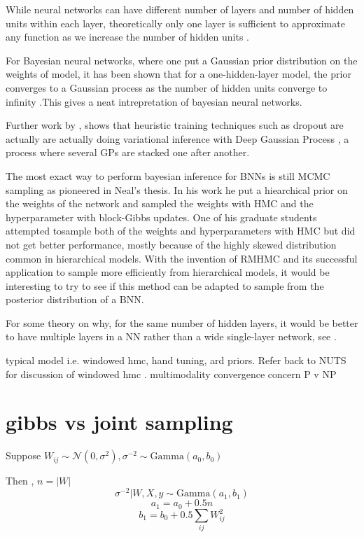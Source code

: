 \documentclass[]{report}
\begin{document}
While neural networks can have different number of layers and number of hidden
units within each layer, theoretically only one layer is sufficient to
approximate any function as we increase the number of hidden units \cite{hornik1991approximation}. 

For Bayesian neural networks, where one put a Gaussian prior distribution on the weights of model, it has been shown that for a one-hidden-layer model, the prior converges to a Gaussian process as the number of hidden units converge to infinity \cite{neal2012bayesian}.This gives a neat intrepretation of bayesian neural networks. 

Further work by \cite{gal2015dropout}, shows that heuristic training techniques such as dropout are actually are actually doing variational inference with Deep Gaussian Process \cite{damianou2013deep}, a process where several GPs are stacked one after another. 

The most exact way to perform bayesian inference for BNNs is still MCMC sampling as pioneered in Neal's thesis. In his work he put a hiearchical prior on the weights of the network and sampled the weights with HMC and the hyperparameter with block-Gibbs updates. One of his graduate students attempted tosample both of the weights and hyperparameters with HMC but did not get better performance, mostly because of the highly skewed distribution common in hierarchical models. With the invention of RMHMC and its successful application to sample more efficiently from hierarchical models, it would be interesting to try to see if this method can be adapted to sample from the posterior distribution of a BNN. 

For some theory on why, for the same number of hidden layers, it would be better to have multiple layers in a NN rather than a wide single-layer network, see \cite{montufar2014number}. 

typical model 
i.e. windowed hmc, hand tuning, ard priors.  Refer back to NUTS for discussion  of windowed hmc . 
multimodality convergence concern P v NP

\section{gibbs vs joint sampling}
Suppose $W_{ij} \sim \mathcal{N}(0,\sigma^2), \sigma^{-2} \sim \text{Gamma}(a_0,b_0) $

Then , $n = |W|$ 
\[\sigma^{-2}|W,X,y \sim \text{Gamma}(a_1,b_1)\]
\[a_1 = a_0 + 0.5 n  \]
\[b_1 = b_0 + 0.5 \sum_{ij} W_{ij}^2 \]
\end{document}
